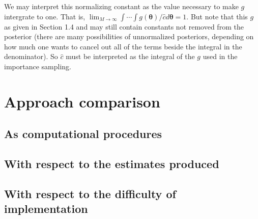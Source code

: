 \documentclass[12pt]{article}
\newcommand{\m}[1]{\mathbf{\bm{#1}}}
\begin{document}
\noindent We may interpret this normalizing constant as the value necessary to make $g$ intergrate to one. That is, $\lim_{M\rightarrow\infty} \int\cdots\int g(\m{\theta})/\hat{c}d\m{\theta} = 1$. But note that this $g$ as given in Section 1.4 and may still contain constants not removed from the posterior (there are many possibilities of unnormalized posteriors, depending on how much one wants to cancel out all of the terms beside the integral in the denominator). So $\hat{c}$ must be interpreted as the integral of the $g$ used in the importance sampling.

\section{Approach comparison}

\subsection{As computational procedures}

\subsection{With respect to the estimates produced}

\subsection{With respect to the difficulty of implementation}
\end{document}

